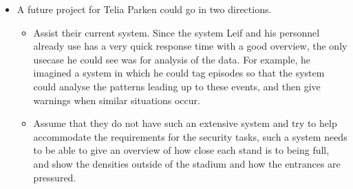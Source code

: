 \begin{itemize}
    \item A future project for Telia Parken could go in two directions.
    \begin{itemize}
        \item Assist their current system. Since the system Leif and his personnel already use has a very quick response time with a good overview, the only usecase he could see was for analysis of the data. For example, he imagined a system in which he could tag episodes so that the system could analyse the patterns leading up to these events, and then give warnings when similar situations occur.
        \item Assume that they do not have such an extensive system and try to help accommodate the requirements for the security tasks, such a system needs to be able to give an overview of how close each stand is to being full, and show the densities outside of the stadium and how the entrances are pressured.
    \end{itemize}
\end{itemize}

